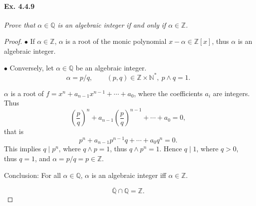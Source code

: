 \documentclass[11pt,a4paper]{article}
\newcommand{\Q}{\mathbb{Q}}
\newcommand{\Z}{\mathbb{Z}}
\newcommand{\N}{\mathbb{N}}
\begin{document}
\paragraph{Ex. 4.4.9}

{\it Prove that $\alpha \in \Q$ is an algebraic integer if and only if $\alpha \in \Z$.
}

\begin{proof}
$\bullet$ If $\alpha \in \Z$, $\alpha$ is a root of  the monic polynomial $x-\alpha \in \Z[x]$, thus  $\alpha$ is an algebraic integer.

$\bullet$ Conversely, let $\alpha \in \Q$ be an algebraic integer.
$$\alpha = p/q, \qquad(p,q) \in \Z\times \N^*, \ p\wedge q = 1.$$
 
 $\alpha$ is a root of $f = x^n+a_{n-1}x^{n-1}+\cdots+a_0$, where the coefficients $a_i$ are integers. Thus
 $$\left(\frac{p}{q}\right)^n+ a_{n-1} \left(\frac{p}{q}\right)^{n-1} + \cdots+a_0 = 0,$$
that is
 $$p^n +a_{n-1} p^{n-1}q +\cdots+a_0q^n = 0.$$
This implies $q \mid p^n$, where $q\wedge p = 1$, thus $q \wedge p^n=1$. Hence $q\mid 1$, where $q>0$, thus $q=1$, and $\alpha = p/q = p \in \Z$.
 
 Conclusion: For all $\alpha \in \Q$, $\alpha$ is an algebraic integer iff $\alpha \in \Z$.
 
 $$\overline{\Q} \cap \Q = \Z.$$
\end{proof}
\end{document}
